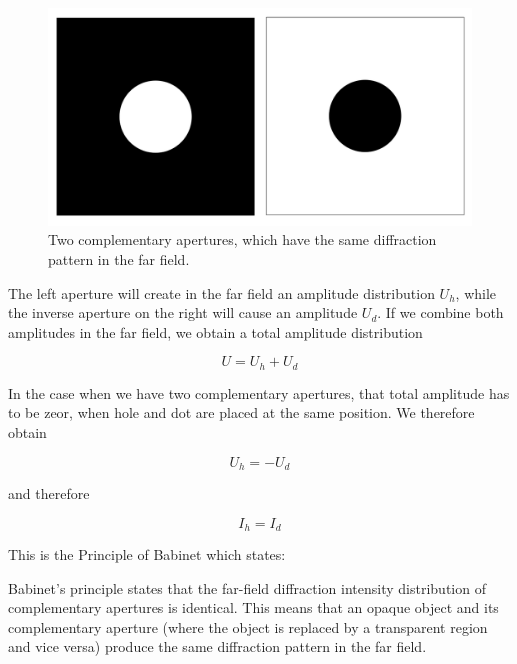 \documentclass[
  a4paper,
]{book}
\begin{document}
\begin{figure}[H]

{\centering \includegraphics[width=0.6\linewidth,height=\textheight,keepaspectratio]{wave-optics/img/babinet.png}

}

\caption{Two complementary apertures, which have the same diffraction
pattern in the far field.}

\end{figure}%

The left aperture will create in the far field an amplitude distribution
\(U_h\), while the inverse aperture on the right will cause an amplitude
\(U_d\). If we combine both amplitudes in the far field, we obtain a
total amplitude distribution

\[
U=U_h+U_d
\]

In the case when we have two complementary apertures, that total
amplitude has to be zeor, when hole and dot are placed at the same
position. We therefore obtain

\[
U_h=-U_d
\]

and therefore

\[
I_h=I_d
\]

This is the Principle of Babinet which states:

\begin{tcolorbox}[enhanced jigsaw, coltitle=black, title=\textcolor{quarto-callout-note-color}{\faInfo}\hspace{0.5em}{Babinet's Principle}, colframe=quarto-callout-note-color-frame, toprule=.15mm, opacitybacktitle=0.6, left=2mm, opacityback=0, breakable, toptitle=1mm, bottomtitle=1mm, leftrule=.75mm, arc=.35mm, titlerule=0mm, colbacktitle=quarto-callout-note-color!10!white, rightrule=.15mm, bottomrule=.15mm, colback=white]

Babinet's principle states that the far-field diffraction intensity
distribution of complementary apertures is identical. This means that an
opaque object and its complementary aperture (where the object is
replaced by a transparent region and vice versa) produce the same
diffraction pattern in the far field.

\end{tcolorbox}
\end{document}
